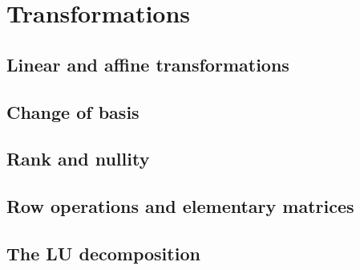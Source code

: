 
\chapter{Transformations}
\label{ch:trans}

\section{Linear and affine transformations}

\section{Change of basis}

\section{Rank and nullity}

\section{Row operations and elementary matrices}

\section{The LU decomposition}
